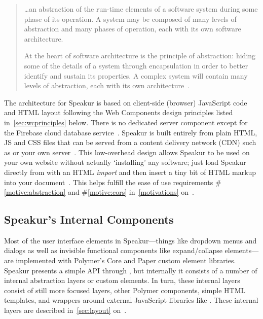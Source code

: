 \begin{quote}
\dots an abstraction of the run-time elements of a software system during some phase of its operation. A system may be composed of many levels of abstraction and many phases of operation, each with its own software architecture.

At the heart of software architecture is the principle of abstraction: hiding some of the details of a system through encapsulation in order to better identify and sustain its properties. A complex system will contain many levels of abstraction, each with its own architecture~\cite{fielding2000}.
\end{quote}

The architecture for Speakur is based on client-side (browser) JavaScript code and HTML layout following the Web Components design principles listed in~\cref{sec:wcprinciples} below. 
There is no dedicated server component except for the Firebase cloud database service~\cite{firebasecontributors2015}.
Speakur is built entirely from plain HTML, JS and CSS files that can be served from a content delivery network (CDN) 
such as  or your own server~\cite{landers2015-d}.
This low-overhead design allows Speakur to be used on your own website without actually `installing' any software;
just load Speakur directly from  with an HTML \textit{import}
and then insert a tiny bit of HTML markup into your document~\cite{landers2015-d}.
This helps fulfill the ease of use requirements 
\#\ref{motive:abstraction} and \#\ref{motive:cors}
in~\cref{motivations} on~.

\subsection{Speakur's Internal Components}
Most of the user interface elements in Speakur---things like dropdown menus and dialogs as well as invisible functional components like expand/collapse elements---are implemented with Polymer's Core and Paper custom element libraries.
Speakur presents a simple API through ,
but internally it consists of a number of internal abstraction layers or custom elements.
In turn, these internal layers consist of still more focused layers, other Polymer components, 
simple HTML templates, 
and wrappers around external JavaScript libraries 
like .
These internal layers are described in~\cref{sec:layout} on~.

